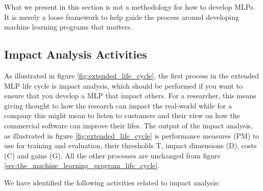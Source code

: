 \documentclass{article}
\theoremstyle{theorem}
\theoremstyle{definition}
\begin{document}
What we present in this section is not a methodology for how to develop MLPs.
It is merely a loose framework to help guide the process around developing machine learning programs that matters.
%

\subsection{Impact Analysis Activities}
As illustrated in figure \ref{fig:extended_life_cycle}, the first process in the extended MLP life cycle is impact analysis, which should be performed if you want to ensure that you develop a MLP that impact others.
For a researcher, this means giving thought to how the research can impact the real-world while for a company this might mean to listen to customers and their view on how the commercial software can improve their lifes.
The output of the impact analysis, as illustrated in figure \ref{fig:extended_life_cycle} is performance measures (PM) to use for training and evaluation, their thresholds T, impact dimensions (D), costs (C) and gains (G).
All the other processes are unchanged from figure \ref{sec:the_machine_learning_program_life_cycle}.

We have identified the following activities related to impact analysis:
\end{document}
